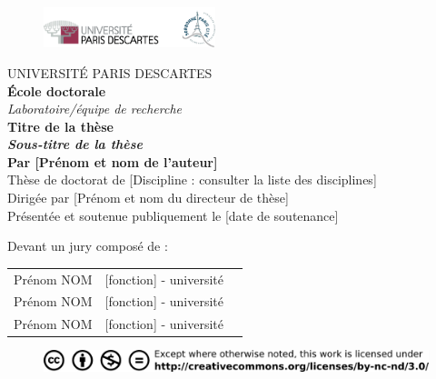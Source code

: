 \documentclass[12pt,]{book}
\title{}
\author{}
\date{}
\theoremstyle{definition}
\theoremstyle{definition}
\theoremstyle{definition}
\theoremstyle{remark}
\begin{document}
\begin{titlepage}
\frontmatter
\begin{figure}[t]
\includegraphics[width=5cm]{../figures-ext/LogoParisDescartes}
\end{figure}

\begin{center}
UNIVERSITÉ PARIS DESCARTES \\
\vspace*{1cm}
\textbf{École doctorale}\\
\vspace*{0,5cm}
\textit{Laboratoire/équipe de recherche}\\
\vspace*{1cm}
\LARGE{\textbf{Titre de la thèse}}\\
\vspace*{0,5cm}
\large{\textit{\textbf{Sous-titre de la thèse}}}\\
\vspace*{2cm}
\large{\textbf{Par [Prénom et nom de l'auteur]}}\\
\vspace*{1cm}
Thèse de doctorat de [Discipline : consulter la liste des disciplines]\\
\vspace*{1cm}
Dirigée par [Prénom et nom du directeur de thèse]\\
\vspace*{1cm}
\small{Présentée et soutenue publiquement le [date de soutenance]}\\
\end{center}
\vspace*{1cm}
\begin{footnotesize}
Devant un jury composé de : \\
\begin{tabular}{lll}
Prénom NOM & [fonction] - université\\
Prénom NOM & [fonction] - université\\
Prénom NOM & [fonction] - université\\
\end{tabular}
\end{footnotesize}

\begin{figure}[b]
\begin{center}
\includegraphics{../figures-ext/creativecommons}
\end{center}
\end{figure}





\end{titlepage}
\end{document}
